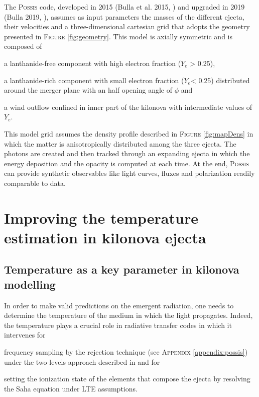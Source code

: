 \documentclass[a4paper, twoside, 11pt]{article}
\numberwithin{equation}{section}
\begin{document}
The  P{\textsc{ossis}}  code, developed in 2015 (Bulla et al. 2015, \cite{POSSIS_2015}) and upgraded in 2019 (Bulla 2019, \cite{POSSIS_2019}),  assumes as input parameters the masses of the different ejecta, their velocities and a three-dimensional cartesian grid that adopts the geometry presented in F\textsc{igure} \ref{fig:geometry}. This model is axially symmetric and is composed of 
\begin{enumerate*}[label=\roman*)]
    \item a lanthanide-free component with high electron fraction ($Y_e$ > 0.25),  
    \item a lanthanide-rich component with small electron fraction ($Y_e$< 0.25) distributed around the merger plane with an half opening angle of $\phi$ and
    \item a wind outflow confined in inner part of the kilonova with intermediate values of $Y_e$. 
\end{enumerate*}
This model grid assumes the density profile described in F\textsc{igure} \ref{fig:mapDens} in which the matter is anisotropically distributed among the three ejecta. The photons are created and then tracked through an expanding ejecta in which the energy deposition and the opacity is computed at each time. At the end, P\textsc{ossis} can provide synthetic observables like light curves, fluxes and polarization readily comparable to data. 
\newpage
\section{Improving the temperature estimation in kilonova ejecta}
\label{sec:TempWork}
\vspace{10pt}
\subsection{Temperature as a key parameter in kilonova modelling}
\label{subsec:TempRole}
\hspace{\parindent}	 In order to make valid predictions on the emergent radiation, one needs to determine the temperature of the medium in which the light propagates. Indeed,  the temperature plays a crucial role in radiative transfer codes in which it intervenes for
\begin{enumerate*}[label=\roman*)]
\item frequency sampling by the rejection technique (see A\textsc{ppendix} \ref{appendix:possis}) under the two-levels approach described in\cite{Magee} and for
\item setting the ionization state of the elements that compose the ejecta by resolving the Saha equation under LTE assumptions. \\
\end{enumerate*} 
\end{document}

